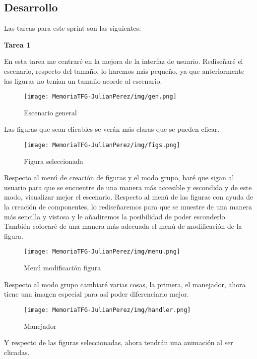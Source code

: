 \documentclass[a4paper, 12pt]{book}
\begin{document}
\subsection{Desarrollo}
Las tareas para este sprint son las siguientes:

\textbf{Tarea 1}

En esta tarea me centraré en la mejora de la interfaz de usuario. Rediseñaré el escenario, respecto del tamaño, lo haremos más pequeño, ya que anteriormente las figuras no tenían un tamaño acorde al escenario.

\begin{figure}[H]
  \centering
  \texttt{[image: MemoriaTFG-JulianPerez/img/gen.png]}
  \caption{Escenario general}\label{gen}
\end{figure}

Las figuras que sean clicables se verán más claras que se pueden clicar.
\begin{figure}[H]
  \centering
  \texttt{[image: MemoriaTFG-JulianPerez/img/figs.png]}
  \caption{Figura seleccionada}\label{scrum}
\end{figure}

Respecto al menú de creación de figuras y el modo grupo, haré que sigan al usuario para que se encuentre de una manera más accesible y escondida y de este modo, visualizar mejor el escenario. Respecto al menú de las figuras con ayuda de la creación de componentes, lo rediseñaremos para que se muestre de una manera más sencilla y vistosa y le añadiremos la posibilidad de poder esconderlo. También colocaré de una manera más adecuada el menú de modificación de la figura. 

\begin{figure}[H]
  \centering
  \texttt{[image: MemoriaTFG-JulianPerez/img/menu.png]}
  \caption{Menú modificación figura}\label{scrum}
\end{figure}

Respecto al modo grupo cambiaré varias cosas, la primera, el manejador, ahora tiene una imagen especial para así poder diferenciarlo mejor.

\begin{figure}[H]
  \centering
  \texttt{[image: MemoriaTFG-JulianPerez/img/handler.png]}
  \caption{Manejador}\label{scrum}
\end{figure}

Y respecto de las figuras seleccionadas, ahora tendrán una animación al ser clicadas.
\end{document}
